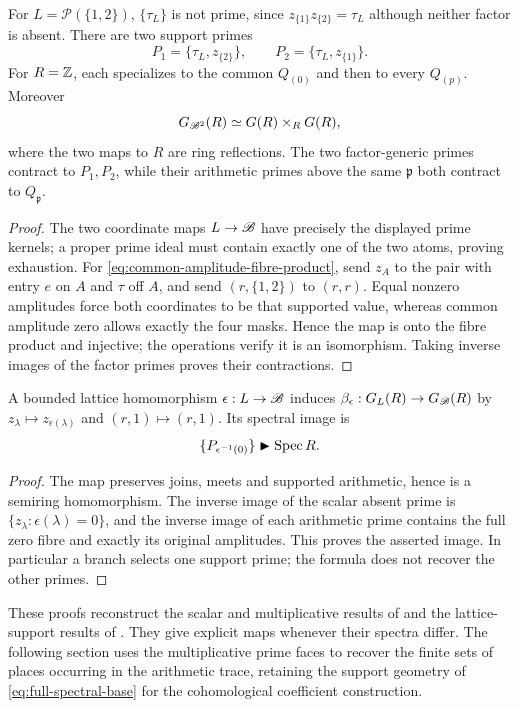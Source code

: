 \begin{proposition}\label{prop:two-support-branches}
For $L=\mathcal P(\{1,2\})$, $\{\tau_L\}$ is not prime, since $z_{\{1\}}z_{\{2\}}=\tau_L$ although neither factor is absent. There are two support primes
\[
 P_1=\{\tau_L,z_{\{2\}}\},\qquad P_2=\{\tau_L,z_{\{1\}}\}.
\]
For $R=\mathbb Z$, each specializes to the common $Q_{(0)}$ and then to every $Q_{(p)}$. Moreover
\begin{equation}\label{eq:common-amplitude-fibre-product}
 G_{\mathscr B^2}(R)\simeq G(R)\mathbin{\times_R}G(R),
\end{equation}
where the two maps to $R$ are ring reflections. The two factor-generic primes contract to $P_1,P_2$, while their arithmetic primes above the same $\mathfrak p$ both contract to $Q_{\mathfrak p}$.
\end{proposition}
\begin{proof}
The two coordinate maps $L\to\mathscr B$ have precisely the displayed prime kernels; a proper prime ideal must contain exactly one of the two atoms, proving exhaustion. For \eqref{eq:common-amplitude-fibre-product}, send $z_A$ to the pair with entry $e$ on $A$ and $\tau$ off $A$, and send $(r,\{1,2\})$ to $(r,r)$. Equal nonzero amplitudes force both coordinates to be that supported value, whereas common amplitude zero allows exactly the four masks. Hence the map is onto the fibre product and injective; the operations verify it is an isomorphism. Taking inverse images of the factor primes proves their contractions.
\end{proof}

\begin{proposition}\label{prop:branch-contraction}
A bounded lattice homomorphism $\epsilon:L\to\mathscr B$ induces $\beta_\epsilon:G_L(R)\to G_\mathscr B(R)$ by $z_\lambda\mapsto z_{\epsilon(\lambda)}$ and $(r,1)\mapsto(r,1)$. Its spectral image is
\[
 \{P_{\epsilon^{-1}(0)}\}\blacktriangleright\operatorname{Spec} R.
\]
\end{proposition}
\begin{proof}
The map preserves joins, meets and supported arithmetic, hence is a semiring homomorphism. The inverse image of the scalar absent prime is $\{z_\lambda:\epsilon(\lambda)=0\}$, and the inverse image of each arithmetic prime contains the full zero fibre and exactly its original amplitudes. This proves the asserted image. In particular a branch selects one support prime; the formula does not recover the other primes.
\end{proof}

These proofs reconstruct the scalar and multiplicative results of \cite{globalization,secondary} and the lattice-support results of \cite{support}. They give explicit maps whenever their spectra differ. The following section uses the multiplicative prime faces to recover the finite sets of places occurring in the arithmetic trace, retaining the support geometry of \eqref{eq:full-spectral-base} for the cohomological coefficient construction.
